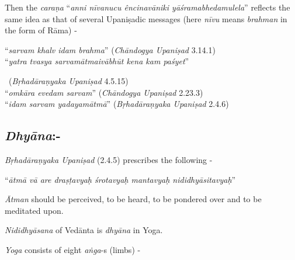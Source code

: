 Then the \textit{caraṇa} “\textit{anni nīvanucu êncinavāniki yāśramabhedamulela}” reflects the same idea as that of several Upaniṣadic messages (here \textit{nīvu} means \textit{brahman} in the form of Rāma) -

\begin{myquote}
“\textit{sarvam khalv idam brahma}” (\textit{Chāndogya Upaniṣad} 3.14.1)\\ “\textit{yatra tvasya sarvamātmaivābhūt kena kam paśyet}” 

~\hfill (\textit{Bṛhadāraṇyaka Upaniṣad} 4.5.15)\\ “\textit{omkāra evedam sarvam}” (\textit{Chāndogya Upaniṣad} 2.23.3)\\ “\textit{idam sarvam yadayamātmā}” (\textit{Bṛhadāraṇyaka Upaniṣad} 2.4.6)
\end{myquote}

\vspace{-.3cm}

\subsection*{\textit{Dhyāna}:-}

\vspace{-.2cm}

\textit{Bṛhadāraṇyaka Upaniṣad} (2.4.5) prescribes the following -

\begin{myquote}
“\textit{ātmā vā are draṣṭavyaḥ śrotavyaḥ mantavyaḥ nididhyāsitavyaḥ}”
\end{myquote}

\textit{Ātman} should be perceived, to be heard, to be pondered over and to be meditated upon.

\textit{Nididhyāsana} of Vedānta is \textit{dhyāna} in Yoga.

\textit{Yoga} consists of eight \textit{aṅga}-s (limbs) -

